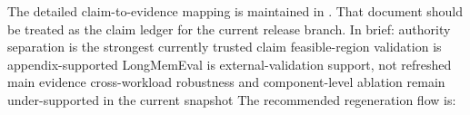 \markdownRendererUlEndTight \markdownRendererInterblockSeparator
{}
\markdownRendererSectionEnd \markdownRendererSectionBegin
{}\markdownRendererInterblockSeparator
{}The detailed claim-to-evidence mapping is maintained in .\markdownRendererSoftLineBreak
{}That document should be treated as the claim ledger for the current release branch.\markdownRendererParagraphSeparator
{}In brief:\markdownRendererInterblockSeparator
{}\markdownRendererUlBeginTight
\markdownRendererUlItem authority separation is the strongest currently trusted claim\markdownRendererUlItemEnd 
\markdownRendererUlItem feasible-region validation is appendix-supported\markdownRendererUlItemEnd 
\markdownRendererUlItem LongMemEval is external-validation support, not refreshed main evidence\markdownRendererUlItemEnd 
\markdownRendererUlItem cross-workload robustness and component-level ablation remain under-supported in the current snapshot\markdownRendererUlItemEnd 
\markdownRendererUlEndTight \markdownRendererInterblockSeparator
{}
\markdownRendererSectionEnd \markdownRendererSectionBegin
{}\markdownRendererInterblockSeparator
{}The recommended regeneration flow is:\markdownRendererInterblockSeparator
{}\markdownRendererUlBeginTight
\markdownRendererUlItem {}\markdownRendererUlItemEnd 
\markdownRendererUlItem {}\markdownRendererUlItemEnd 
\markdownRendererUlItem {}\markdownRendererUlItemEnd 
\markdownRendererUlItem {}\markdownRendererUlItemEnd 
\markdownRendererUlItem {}\markdownRendererUlItemEnd 
\markdownRendererUlItem {}\markdownRendererUlItemEnd 
